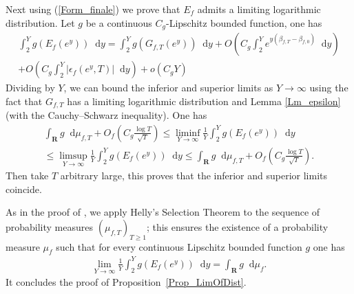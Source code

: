 \documentclass[a4paper,10pt]{amsart}
\theoremstyle{plain}
\theoremstyle{definition}
\begin{document}
Next using (\ref{Form_finale}) we prove that $E_{f}$ admits a limiting logarithmic distribution.
Let $g$ be a continuous $C_{g}$-Lipschitz bounded function, one has 
\begin{multline*}
\int_{2}^{Y} g(E_{f}(e^{y})){\mathop{}\!\mathrm{d}} y = \int_{2}^{Y}g(G_{f,T}(e^{y})){\mathop{}\!\mathrm{d}} y 
+ O\left( C_{g}\int_{2}^{Y}e^{y(\beta_{f,T}-\beta_{f,0})}{\mathop{}\!\mathrm{d}} y\right) \\
+ O\left( C_{g}\int_{2}^{Y}\lvert \epsilon_{f}(e^{y},T)\rvert {\mathop{}\!\mathrm{d}} y \right)
+ o(C_{g} Y)
\end{multline*}
Dividing by $Y$, 
we can bound the inferior and superior limits as $Y \rightarrow \infty$
using the fact that $G_{f,T}$ has a limiting logarithmic distribution and Lemma \ref{Lm_epsilon} (with the Cauchy--Schwarz inequality). One has
\begin{multline}\label{Formule_BoundsLimDist}
\int_{\mathbf{R}}g {\mathop{}\!\mathrm{d}}\mu_{f,T} + O_{f}\left(C_{g} \frac{\log T }{\sqrt{T}} \right) \leq
\liminf_{Y\rightarrow\infty} \frac{1}{Y}  \int_{2}^{Y}g(E_{f}(e^{y})) {\mathop{}\!\mathrm{d}} y \\
\leq \limsup_{Y\rightarrow\infty} \frac{1}{Y}  \int_{2}^{Y}g(E_{f}(e^{y})) {\mathop{}\!\mathrm{d}} y  \leq
\int_{\mathbf{R}}g {\mathop{}\!\mathrm{d}} \mu_{f,T} + O_{f}\left(C_{g} \frac{\log T}{\sqrt{T}} \right).
\end{multline}
Then take $T$ arbitrary large, this proves that the inferior and superior limits coincide.

As in the proof of \cite[Th. 2.9]{ANS}, we apply Helly's Selection Theorem to the sequence of probability measures $(\mu_{f,T})_{T\geq 1}$;
this ensures the existence of a probability measure $\mu_{f}$ such that
for every continuous Lipschitz bounded function $g$ one has
\begin{align*}
\lim_{Y\rightarrow \infty} \frac{1}{Y}  \int_{2}^{Y}g(E_{f}(e^{y})) {\mathop{}\!\mathrm{d}} y   = \int_{\mathbf{R}} g {\mathop{}\!\mathrm{d}}\mu_{f}.
\end{align*} 
It concludes the proof of Proposition~\ref{Prop_LimOfDist}.
\end{document}
